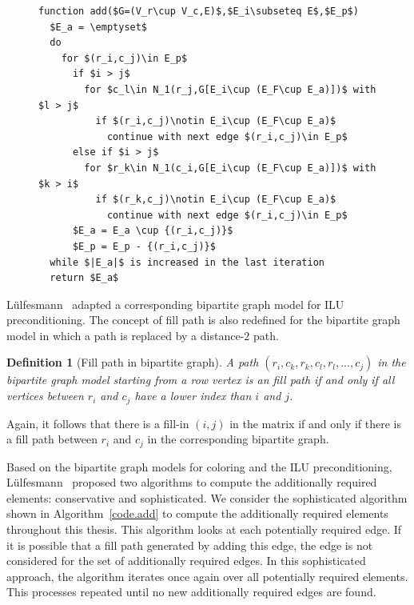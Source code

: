 \documentclass[12pt, twoside,a4paper,toc=bibliography]{scrbook}
\newtheorem{definition}{Definition}
\newcommand{\coderef}[1]{Algorithm~\protect\ref{#1}}
\begin{document}
\begin{figure}
\begin{lstlisting}[caption=Find additionally required elements,
label=code.add,mathescape]
function add($G=(V_r\cup V_c,E)$,$E_i\subseteq E$,$E_p$)
  $E_a = \emptyset$
  do
    for $(r_i,c_j)\in E_p$
      if $i > j$
        for $c_l\in N_1(r_j,G[E_i\cup (E_F\cup E_a)])$ with $l > j$
          if $(r_i,c_j)\notin E_i\cup (E_F\cup E_a)$
            continue with next edge $(r_i,c_j)\in E_p$
      else if $i > j$
        for $r_k\in N_1(c_i,G[E_i\cup (E_F\cup E_a)])$ with $k > i$
          if $(r_k,c_j)\notin E_i\cup (E_F\cup E_a)$
            continue with next edge $(r_i,c_j)\in E_p$
      $E_a = E_a \cup {(r_i,c_j)}$
      $E_p = E_p - {(r_i,c_j)}$
  while $|E_a|$ is increased in the last iteration
  return $E_a$
\end{lstlisting}
\end{figure}
Lülfesmann~\cite{Lulfesmann2012Fap} adapted a
corresponding bipartite graph model for ILU preconditioning.
The concept of fill path is also redefined for the bipartite graph model
in which a path is replaced by a distance-$2$ path.
\begin{definition}[Fill path in bipartite graph]\label{d.fill.path.bipartite}
A path $(r_i,c_k,r_k,c_l,r_l,...,c_j)$ in the bipartite graph model starting
from a row vertex is an fill path 
if and only if all vertices between $r_i$ and $c_j$ have a lower index than $i$
and $j$. 
\end{definition}
Again, it follows that 
there is a fill-in $(i,j)$ in the matrix if and only if there is a
fill path between $r_i$ and $c_j$ in the corresponding bipartite graph.

Based on the bipartite graph models for coloring and the ILU preconditioning,
Lülfesmann~\cite{Lulfesmann2012Fap} proposed two algorithms to compute the additionally required elements: conservative and sophisticated. 
We consider the sophisticated algorithm shown in \coderef{code.add}
to compute the additionally required elements
throughout this thesis. This algorithm looks at each potentially required edge.
If it is possible that a fill path generated by adding this edge,
the edge is not considered for the set of additionally required edges.
In this sophisticated approach, the algorithm iterates once again over 
all potentially required elements. This processes repeated until 
no new additionally required edges are found.

\end{document}
